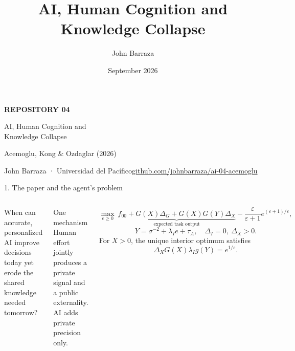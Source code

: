 \documentclass[aspectratio=169,10pt]{beamer}
\title{AI, Human Cognition and Knowledge Collapse}
\author{John Barraza}
\institute{Universidad del Pacífico · AI Economic Modelling}
\date{September 2026}
\begin{document}
\begin{frame}[plain]
  \vspace{.55cm}
  {\color{AKORed}\large\bfseries REPOSITORY 04}\par\vspace{.35cm}
  {\color{AKONavy}AI, Human Cognition and\\Knowledge Collapse}\par\vspace{.35cm}
  {\large Acemoglu, Kong \& Ozdaglar (2026)}\par\vspace{.6cm}
  \vfill
  {\small John Barraza · Universidad del Pacífico}\hfill{\small\href{https://github.com/johnbarraza/ai-04-acemoglu}{github.com/johnbarraza/ai-04-acemoglu}}
\end{frame}

\begin{frame}{1. The paper and the agent's problem}
\small
\begin{columns}[T,onlytextwidth]
  \par\vspace{.25cm}
  When can accurate, personalized AI improve decisions today yet erode the shared knowledge needed tomorrow?
  \vspace{.4cm}
  \begin{block}{One mechanism}
  Human effort jointly produces a private signal and a public externality. AI adds private precision only.
  \end{block}
  \par\vspace{.15cm}
  \[
  \max_{e\ge0}\ \underbrace{f_{00}+G(X)\Delta_G+G(X)G(Y)\Delta_X}_{\text{expected task output}}
  -\frac{\varepsilon}{\varepsilon+1}e^{(\varepsilon+1)/\varepsilon},
  \]
  \[
  Y=\sigma^{-2}+\lambda_Ie+\tau_A,\quad
  \Delta_I=0,\ \Delta_X>0.
  \]
  For $X>0$, the unique interior optimum satisfies
  \[
  \Delta_XG(X)\lambda_Ig(Y)=e^{1/\varepsilon}.
  \]
\end{columns}
\end{frame}
\end{document}
